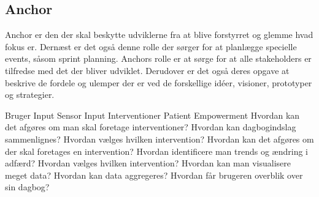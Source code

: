 \subsection{Anchor}
Anchor er den der skal beskytte udviklerne fra at blive forstyrret og glemme hvad fokus er.
Dernæst er det også denne rolle der sørger for at planlægge specielle events, såsom sprint planning.
Anchors rolle er at sørge for at alle stakeholders er tilfredse med det der bliver udviklet.
Derudover er det også deres opgave at beskrive de fordele og ulemper der er ved de forskellige idéer, visioner, prototyper og strategier.

\coord
  {Bruger Input}
  {Sensor Input}
  {Interventioner}
  {Patient Empowerment}
  {Hvordan kan det afgøres om man skal foretage interventioner?
    Hvordan kan dagbogindslag sammenlignes?
    Hvordan vælges hvilken intervention?}
  {Hvordan kan det afgøres om der skal foretages en intervention?
    Hvordan identificere man trends og ændring i adfærd?
    Hvordan vælges hvilken intervention?}
  {Hvordan kan man visualisere meget data?
    Hvordan kan data aggregeres?}
  {Hvordan får brugeren overblik over sin dagbog?}

